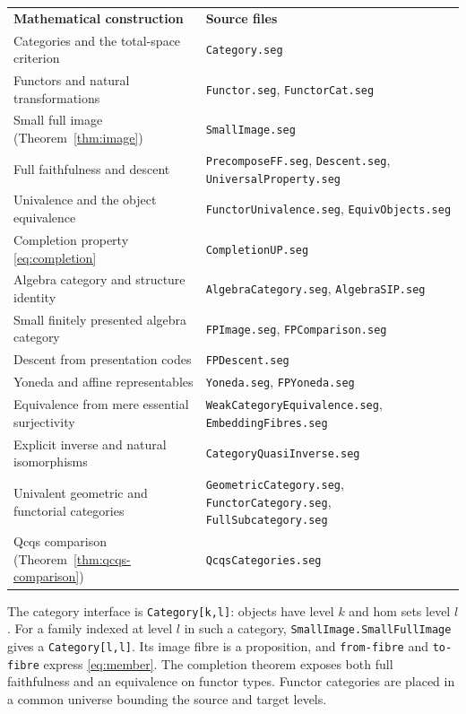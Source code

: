 \documentclass[11pt]{amsart}
\theoremstyle{definition}
\theoremstyle{remark}
\newcommand{\code}[1]{\texttt{\small #1}}
\begin{document}
\medskip
\noindent\begin{tabular}{@{}>{\raggedright\arraybackslash}p{}%
>{\raggedright\arraybackslash}p{}@{}}
\textbf{Mathematical construction}&\textbf{Source files}\\[4pt]
Categories and the total-space criterion&
\code{Category.seg}\\[4pt]
Functors and natural transformations&
\code{Functor.seg}, \code{FunctorCat.seg}\\[4pt]
Small full image (Theorem~\ref{thm:image})&
\code{SmallImage.seg}\\[4pt]
Full faithfulness and descent&
\code{PrecomposeFF.seg}, \code{Descent.seg},
\code{UniversalProperty.seg}\\[4pt]
Univalence and the object equivalence&
\code{FunctorUnivalence.seg}, \code{EquivObjects.seg}\\[4pt]
Completion property \eqref{eq:completion}&
\code{CompletionUP.seg}\\[4pt]
Algebra category and structure identity&
\code{AlgebraCategory.seg}, \code{AlgebraSIP.seg}\\[4pt]
Small finitely presented algebra category&
\code{FPImage.seg}, \code{FPComparison.seg}\\[4pt]
Descent from presentation codes&\code{FPDescent.seg}\\[4pt]
Yoneda and affine representables&
\code{Yoneda.seg}, \code{FPYoneda.seg}\\[4pt]
Equivalence from mere essential surjectivity&
\code{WeakCategoryEquivalence.seg}, \code{EmbeddingFibres.seg}\\[4pt]
Explicit inverse and natural isomorphisms&
\code{CategoryQuasiInverse.seg}\\[4pt]
Univalent geometric and functorial categories&
\code{GeometricCategory.seg}, \code{FunctorCategory.seg},
\code{FullSubcategory.seg}\\[4pt]
Qcqs comparison (Theorem~\ref{thm:qcqs-comparison})&
\code{QcqsCategories.seg}
\end{tabular}
\medskip

The category interface is \code{Category[k,l]}: objects have level $k$
and hom sets level $l$. For a family indexed at level $l$ in such a
category, \code{SmallImage.SmallFullImage} gives a
\code{Category[l,l]}. Its image fibre is a proposition, and
\code{from-fibre} and \code{to-fibre} express \eqref{eq:member}.
The completion theorem exposes both full faithfulness and an equivalence
on functor types. Functor categories are placed in a common universe
bounding the source and target levels.
\end{document}
